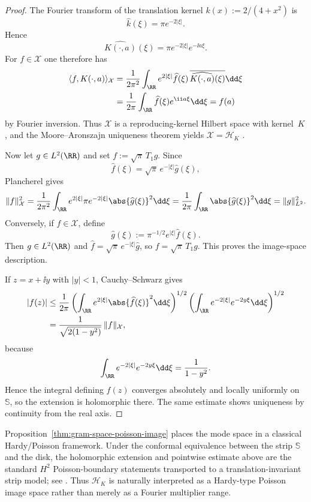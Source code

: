 \begin{proof}
The Fourier transform of the translation kernel $k(x):=2/(4+x^2)$ is
\[
\widehat k(\xi)=\pi e^{-2|\xi|}.
\]
Hence
\[
\widehat{K(\cdot,a)}(\xi)=\pi e^{-2|\xi|}e^{-\ii a\xi}.
\]
For $f\in\mathcal X$ one therefore has
\begin{align*}
\langle f,K(\cdot,a)\rangle_{\mathcal X}
&=
\frac{1}{2\pi^2}\int_{\RR}
e^{2|\xi|}\widehat f(\xi)\,
\overline{\widehat{K(\cdot,a)}(\xi)}\dd\xi \\
&=
\frac{1}{2\pi}\int_{\RR}\widehat f(\xi)e^{\ii a\xi}\dd\xi
=f(a)
\end{align*}
by Fourier inversion.  Thus $\mathcal X$ is a reproducing-kernel Hilbert
space with kernel~$K$, and the Moore--Aronszajn uniqueness theorem yields
$\mathcal X=\mathcal H_K$ \cite{Aronszajn1950}.

Now let $g\in L^2(\RR)$ and set $f:=\sqrt{\pi}\,T_1 g$.  Since
\[
\widehat f(\xi)=\sqrt{\pi}\,e^{-|\xi|}\widehat g(\xi),
\]
Plancherel gives
\[
\|f\|_{\mathcal X}^2
=\frac{1}{2\pi^2}\int_{\RR}e^{2|\xi|}\pi e^{-2|\xi|}
\abs{\widehat g(\xi)}^2\dd\xi
=\frac{1}{2\pi}\int_{\RR}\abs{\widehat g(\xi)}^2\dd\xi
=\|g\|_{L^2}^2.
\]
Conversely, if $f\in\mathcal X$, define
\[
\widehat g(\xi):=\pi^{-1/2}e^{|\xi|}\widehat f(\xi).
\]
Then $g\in L^2(\RR)$ and
$\widehat f=\sqrt{\pi}\,e^{-|\xi|}\widehat g$, so
$f=\sqrt{\pi}\,T_1 g$.  This proves the image-space description.

If $z=x+\ii y$ with $|y|<1$, Cauchy--Schwarz gives
\begin{align*}
|f(z)|
&\le \frac{1}{2\pi}
\left(\int_{\RR}e^{2|\xi|}\abs{\widehat f(\xi)}^2\dd\xi\right)^{1/2}
\left(\int_{\RR}e^{-2|\xi|}e^{-2y\xi}\dd\xi\right)^{1/2} \\
&=
\frac{1}{\sqrt{2(1-y^2)}}\,\|f\|_{\mathcal X},
\end{align*}
because
\[
\int_{\RR}e^{-2|\xi|}e^{-2y\xi}\dd\xi=\frac{1}{1-y^2}.
\]
Hence the integral defining $f(z)$ converges absolutely and locally
uniformly on $\mathbb S$, so the extension is holomorphic there.  The same
estimate shows uniqueness by continuity from the real axis.
\end{proof}

\begin{remark}
Proposition~\ref{thm:gram-space-poisson-image} places the mode space in a
classical Hardy/Poisson framework.  Under the conformal equivalence
between the strip $\mathbb S$ and the disk, the holomorphic extension and
pointwise estimate above are the standard $H^2$ Poisson-boundary
statements transported to a translation-invariant strip model; see
\cite{Duren1970,Rudin1987}.  Thus $\mathcal H_K$ is naturally interpreted
as a Hardy-type Poisson image space rather than merely as a Fourier
multiplier range.
\end{remark}

